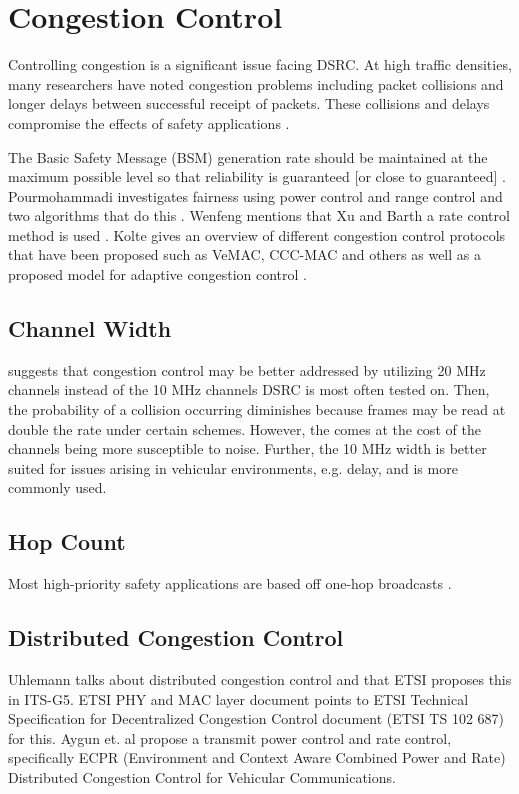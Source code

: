 \documentclass[twoside,conference]{IEEEtran}
\begin{document}
\section{Congestion Control}\label{sec:congestion}

	Controlling congestion is a significant issue facing DSRC. At high traffic densities, many researchers have noted congestion problems including packet collisions and longer delays between successful receipt of packets. These collisions and delays compromise the effects of safety applications \cite{Subramanian2012}.
	
	The Basic Safety Message (BSM) generation rate should be maintained at the maximum possible level so that reliability is guaranteed [or close to guaranteed] \cite{Wenfeng2014}.  Pourmohammadi investigates fairness using power control and range control and two algorithms that do this \cite{Pourmohammadi2015}.  Wenfeng mentions that Xu and Barth a rate control method is used \cite{Wenfeng2014,Xu2004-2}.  Kolte gives an overview of different congestion control protocols that have been proposed such as VeMAC, CCC-MAC and others as well as a proposed model for adaptive congestion control \cite{Kolte2014}. \\

	\subsection{Channel Width}\label{sec:channelwidth}
		\cite{Kenney2011} suggests that congestion control may be better addressed by utilizing 20 MHz channels instead of the 10 MHz channels DSRC is most often tested on. Then, the probability of a collision occurring diminishes because frames may be read at double the rate under certain schemes. However, the comes at the cost of the channels being more susceptible to noise. Further, the 10 MHz width is better suited for issues arising in vehicular environments, e.g. delay, and is more commonly used.
	
	\subsection{Hop Count}\label{sec:hopcount}
		Most high-priority safety applications are based off one-hop broadcasts \cite{Omar2013}. 

	\subsection{Distributed Congestion Control}\label{sec:distributedcongestion}
		Uhlemann talks about distributed congestion control and that ETSI proposes this in ITS-G5\cite{Uhlemann2015}.  ETSI PHY and MAC layer document \cite{ETSI-ES202663} points to ETSI Technical Specification for Decentralized Congestion Control document (ETSI TS 102 687) for this\cite{ETSI-TS102687}.  Aygun et. al propose a transmit power control and rate control, specifically ECPR (Environment and Context Aware Combined Power and Rate) Distributed Congestion Control for Vehicular Communications\cite{Aygun2015}.
\end{document}
